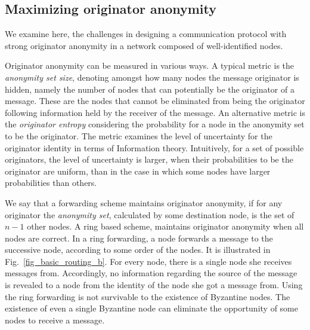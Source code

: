 \subsection{Maximizing originator anonymity}

We examine here, the challenges in designing a communication protocol with strong originator anonymity in a network composed of well-identified nodes. 

Originator anonymity can be measured in various ways.  
A typical metric is the \emph{anonymity set size}, denoting amongst how many nodes the message originator is hidden, namely 
the number of nodes that can potentially be the originator of a message. These are the nodes that cannot be eliminated from being the originator following information held by the receiver of the message.
An alternative metric is the \emph{originator entropy} considering the probability  for  a node in the anonymity set to be the originator. The metric examines the level of uncertainty  for the originator identity in terms of Information theory.
Intuitively, for a set of possible originators, the level of uncertainty is larger, when their probabilities to be the originator are uniform, than in the case in which some nodes have larger probabilities than others.
 

We say that a forwarding scheme maintains originator anonymity, if for any originator the \emph{anonymity set}, calculated by some destination node, is the set of $n-1$ other nodes. A ring based scheme, maintains originator anonymity when all nodes are correct.
In a ring forwarding, a node forwards a message to the successive node, according to some order of the nodes. It is illustrated in Fig.~\ref{fig_basic_routing_b}.  
For every node, there is a single node she receives messages from. Accordingly, no information regarding the source of the message is revealed to a node from the identity of the node she got a message from. 
Using the ring forwarding is not survivable to the existence of Byzantine nodes. The existence of even a single Byzantine node can eliminate the opportunity of some nodes to receive a message.

